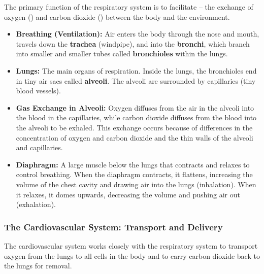 The primary function of the respiratory system is to facilitate  – the exchange of oxygen () and carbon dioxide () between the body and the environment.

\begin{itemize}
    \item \textbf{Breathing (Ventilation):} Air enters the body through the nose and mouth, travels down the \textbf{trachea} (windpipe), and into the \textbf{bronchi}, which branch into smaller and smaller tubes called \textbf{bronchioles} within the lungs.
    \item \textbf{Lungs:} The main organs of respiration.  Inside the lungs, the bronchioles end in tiny air sacs called \textbf{alveoli}.  The alveoli are surrounded by capillaries (tiny blood vessels).
    \item \textbf{Gas Exchange in Alveoli:} Oxygen diffuses from the air in the alveoli into the blood in the capillaries, while carbon dioxide diffuses from the blood into the alveoli to be exhaled.  This exchange occurs because of differences in the concentration of oxygen and carbon dioxide and the thin walls of the alveoli and capillaries.
    \item \textbf{Diaphragm:} A large muscle below the lungs that contracts and relaxes to control breathing.  When the diaphragm contracts, it flattens, increasing the volume of the chest cavity and drawing air into the lungs (inhalation). When it relaxes, it domes upwards, decreasing the volume and pushing air out (exhalation).
\end{itemize}

\subsubsection{The Cardiovascular System: Transport and Delivery}

The cardiovascular system works closely with the respiratory system to transport oxygen from the lungs to all cells in the body and to carry carbon dioxide back to the lungs for removal.

